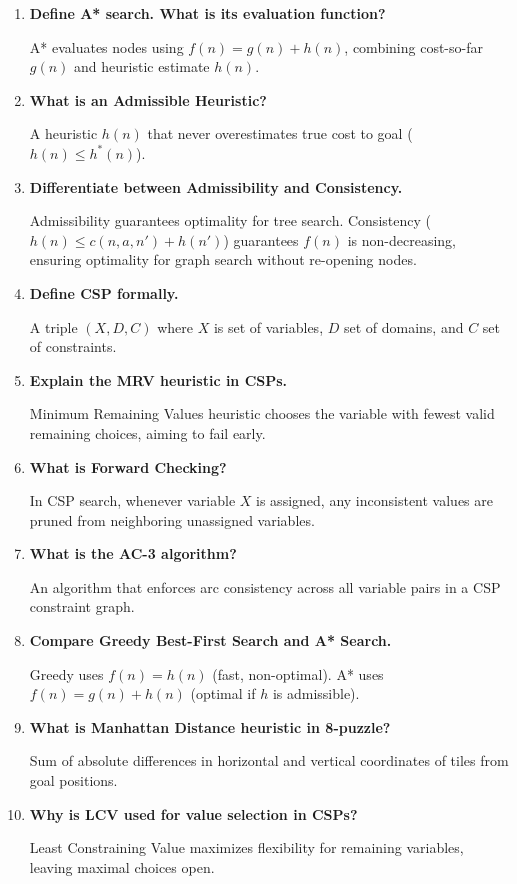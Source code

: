 \documentclass[12pt,a4paper]{article}
\newcommand{\Q}[1]{\textbf{#1}\par\noindent\ignorespaces}
\begin{document}
\begin{tcolorbox}[exambox, title={\textbf{Frequently Asked / Viva Questions}}]
  \begin{enumerate}[topsep=0pt, label=\textbf{Q\arabic*.}, itemsep=5pt]
    \item \Q{Define A* search. What is its evaluation function?}
    A* evaluates nodes using $f(n) = g(n) + h(n)$, combining cost-so-far $g(n)$ and heuristic estimate $h(n)$.

    \item \Q{What is an Admissible Heuristic?}
    A heuristic $h(n)$ that never overestimates true cost to goal ($h(n) \le h^*(n)$).

    \item \Q{Differentiate between Admissibility and Consistency.}
    Admissibility guarantees optimality for tree search. Consistency ($h(n) \le c(n,a,n') + h(n')$) guarantees $f(n)$ is non-decreasing, ensuring optimality for graph search without re-opening nodes.

    \item \Q{Define CSP formally.}
    A triple $(X, D, C)$ where $X$ is set of variables, $D$ set of domains, and $C$ set of constraints.

    \item \Q{Explain the MRV heuristic in CSPs.}
    Minimum Remaining Values heuristic chooses the variable with fewest valid remaining choices, aiming to fail early.

    \item \Q{What is Forward Checking?}
    In CSP search, whenever variable $X$ is assigned, any inconsistent values are pruned from neighboring unassigned variables.

    \item \Q{What is the AC-3 algorithm?}
    An algorithm that enforces arc consistency across all variable pairs in a CSP constraint graph.

    \item \Q{Compare Greedy Best-First Search and A* Search.}
    Greedy uses $f(n) = h(n)$ (fast, non-optimal). A* uses $f(n) = g(n) + h(n)$ (optimal if $h$ is admissible).

    \item \Q{What is Manhattan Distance heuristic in 8-puzzle?}
    Sum of absolute differences in horizontal and vertical coordinates of tiles from goal positions.

    \item \Q{Why is LCV used for value selection in CSPs?}
    Least Constraining Value maximizes flexibility for remaining variables, leaving maximal choices open.
  \end{enumerate}
\end{tcolorbox}
\end{document}
